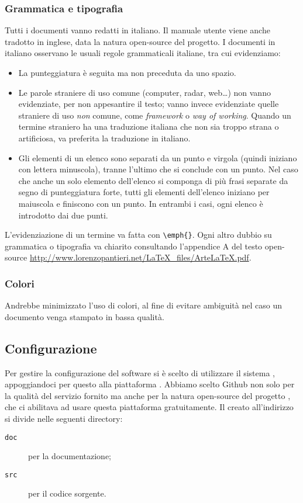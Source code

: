 \subsubsection{Grammatica e tipografia} Tutti i documenti vanno redatti in italiano. Il manuale utente viene anche tradotto in inglese, data la natura open-source del progetto. I documenti in italiano osservano le usuali regole grammaticali italiane, tra cui evidenziamo:
\begin{itemize}
	\item La punteggiatura è seguita ma non preceduta da uno spazio.
	\item Le parole straniere di uso comune (computer, radar, web\dots) non vanno evidenziate, per non appesantire il testo; vanno invece evidenziate quelle straniere di uso \emph{non} comune, come \emph{framework} o \emph{way of working}. Quando un termine straniero ha una traduzione italiana che non sia troppo strana o artificiosa, va preferita la traduzione in italiano.
	\item Gli elementi di un elenco sono separati da un punto e virgola (quindi iniziano con lettera minuscola), tranne l'ultimo che si conclude con un punto. Nel caso che anche un solo elemento dell'elenco si componga di più frasi separate da segno di punteggiatura forte, tutti gli elementi dell'elenco iniziano per maiuscola e finiscono con un punto. In entrambi i casi, ogni elenco è introdotto dai due punti.
\end{itemize}
L'evidenziazione di un termine va fatta con \texttt{\textbackslash emph\{\}}. Ogni altro dubbio su grammatica o tipografia va chiarito consultando l'appendice A del testo open-source \url{http://www.lorenzopantieri.net/LaTeX_files/ArteLaTeX.pdf}.

\subsubsection{Colori} Andrebbe minimizzato l'uso di colori, al fine di evitare ambiguità nel caso un documento venga stampato in bassa qualità.

\subsection{Configurazione} \label{sec:config}
Per gestire la configurazione del software si è scelto di utilizzare il sistema , appoggiandoci per questo alla piattaforma . Abbiamo scelto Github non solo per la qualità del servizio fornito ma anche per la natura open-source del progetto \proj, che ci abilitava ad usare questa piattaforma gratuitamente. Il  creato all'indirizzo \repo{} si divide nelle seguenti directory:
\begin{description}
	\item[\texttt{doc}] per la documentazione;
	\item[\texttt{src}] per il codice sorgente.
\end{description}

